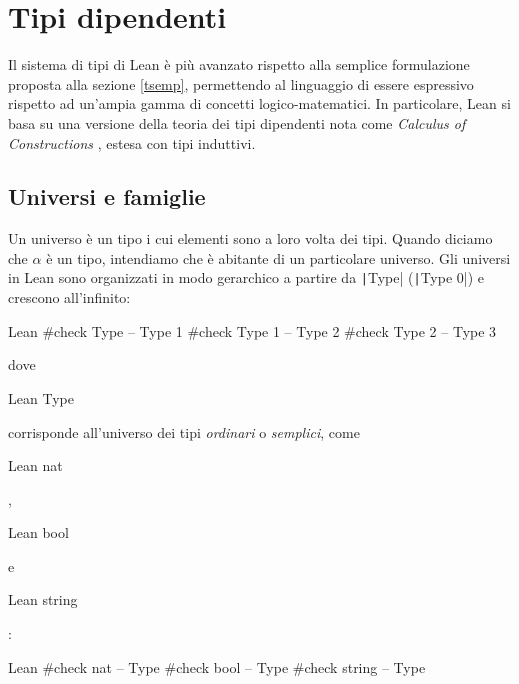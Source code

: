 \section{Tipi dipendenti} \label{tdep}
Il sistema di tipi di Lean è più avanzato rispetto alla semplice formulazione proposta alla sezione \ref{tsemp}, permettendo al linguaggio di essere espressivo rispetto ad un'ampia gamma di concetti logico-matematici. In particolare, Lean si basa su una versione della teoria dei tipi dipendenti nota come \emph{Calculus of Constructions} \cite{coquand:inria-00076024}, estesa con tipi induttivi.

\subsection{Universi e famiglie}
Un universo è un tipo i cui elementi sono a loro volta dei tipi. Quando diciamo che $\alpha$ è un tipo, intendiamo che è abitante di un particolare universo. Gli universi in Lean sono organizzati in modo gerarchico a partire da \texttt|Type| (\texttt|Type 0|) e crescono all'infinito:
\begin{code}{Lean}
#check Type -- Type 1
#check Type 1 -- Type 2
#check Type 2 -- Type 3
\end{code}
dove \begin{mintinline}{Lean} Type \end{mintinline} corrisponde all'universo dei tipi \emph{ordinari} o \emph{semplici}, come  \begin{mintinline}{Lean} nat \end{mintinline}, \begin{mintinline}{Lean} bool \end{mintinline} e \begin{mintinline}{Lean} string \end{mintinline}:
\begin{code}{Lean}
#check nat -- Type
#check bool -- Type
#check string -- Type
\end{code}

